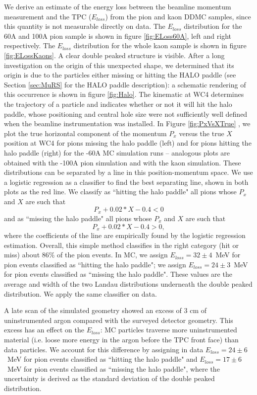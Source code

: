 We derive an estimate of the energy loss between the beamline momentum measurement and the TPC ($E_{loss}$) from the pion and kaon DDMC samples, since this quantity is not  measurable directly on data. 
The $E_{loss}$ distribution for the 60A  and 100A pion sample is shown in figure \ref{fig:ELoss60A}, left and right respectively. The $E_{loss}$ distribution for the  whole kaon sample is shown in figure \ref{fig:ELossKaons}. A clear double peaked structure is visible. After a long investigation on the origin of this unexpected shape, we determined that its origin is due to the particles either missing or hitting the HALO paddle (see Section \ref{sec:MuRS} for the HALO paddle description): a schematic rendering of this occurrence is  shown in figure \ref{fig:Halo}. The kinematic at WC4 determines the trajectory of a particle and indicates whether or not it will hit the halo paddle, whose positioning and central hole size were not sufficiently well defined when the beamline instrumentation was installed. In Figure \ref{fig:PxVsXTrue} , we plot the true  horizontal component of the momentum $P_x$ versus the true $X$ position at WC4 for pions missing the halo paddle (left) and for pions hitting the halo paddle (right) for the -60A MC simulation runs -- analogous plots are obtained with the -100A pion simulation and with the kaon simulation. These distributions can be separated by a line in this position-momentum space. 
We use a logistic regression  \cite{agresti2013categorical}  as a classifier to find the best separating line, shown in both plots as the red line. We classify as ``hitting the halo paddle" all pions whose $P_x$ and $X$ are such that $$P_x +0.02* X - 0.4 < 0 $$ and as ``missing the halo  paddle" all pions whose $P_x$ and $X$ are such that $$P_x +0.02*X - 0.4 > 0, $$ where the coefficients of the line are empirically found by the logistic regression estimation. Overall, this simple method classifies in the right category (hit or miss) about 86\% of the pion events. In MC, we assign  $E_{loss} = 32 \pm 4 $~MeV for pion events classified as ``hitting the halo paddle"; we assign  $E_{loss} = 24 \pm 3 $~MeV for pion events classified as ``missing the halo paddle". These values are the average and width of the two Landau distributions underneath the double peaked distribution. We apply the same classifier on data. 

A late scan of the simulated geometry showed an excess of 3 cm of uninstrumented argon compared with the surveyed detector geometry. This excess has an effect on the $E_{loss}$: MC particles traverse more uninstrumented material  (i.e. loose more energy in the argon before the TPC front face) than data particles.
We account for this difference by assigning in data $E_{loss} = 24 \pm 6 $~MeV for pion events classified as ``hitting the halo paddle" and  $E_{loss} = 17 \pm 6 $~MeV for pion events classified as ``missing the halo paddle", where the uncertainty is derived as the standard deviation of the double peaked distribution.


